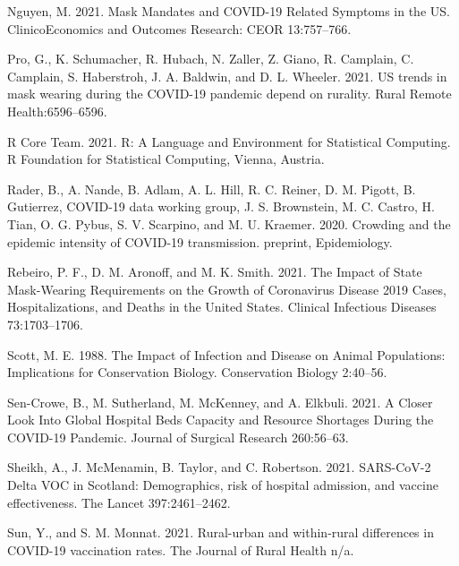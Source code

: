 \documentclass[
  12pt,
]{article}
\newlength{\cslhangindent}
\newlength{\cslentryspacingunit} %
\newenvironment{CSLReferences}[2] %
 {%
  \setlength{\parindent}{0pt}
  \ifodd #1
  \let\oldpar\par
  \def\par{\hangindent=\cslhangindent\oldpar}
  \fi
  \setlength{\parskip}{#2\cslentryspacingunit}
 }%
 {}
\begin{document}
\begin{CSLReferences}{1}{0}
\leavevmode{}%
Nguyen, M. 2021. Mask {Mandates} and {COVID}-19 {Related} {Symptoms} in the {US}. ClinicoEconomics and Outcomes Research: CEOR 13:757--766.

\leavevmode{}%
Pro, G., K. Schumacher, R. Hubach, N. Zaller, Z. Giano, R. Camplain, C. Camplain, S. Haberstroh, J. A. Baldwin, and D. L. Wheeler. 2021. {US} trends in mask wearing during the {COVID}-19 pandemic depend on rurality. Rural Remote Health:6596--6596.

\leavevmode{}%
R Core Team. 2021. R: {A} {Language} and {Environment} for {Statistical} {Computing}. R Foundation for Statistical Computing, Vienna, Austria.

\leavevmode{}%
Rader, B., A. Nande, B. Adlam, A. L. Hill, R. C. Reiner, D. M. Pigott, B. Gutierrez, COVID-19 data working group, J. S. Brownstein, M. C. Castro, H. Tian, O. G. Pybus, S. V. Scarpino, and M. U. Kraemer. 2020. Crowding and the epidemic intensity of {COVID}-19 transmission. preprint, Epidemiology.

\leavevmode{}%
Rebeiro, P. F., D. M. Aronoff, and M. K. Smith. 2021. The {Impact} of {State} {Mask}-{Wearing} {Requirements} on the {Growth} of {Coronavirus} {Disease} 2019 {Cases}, {Hospitalizations}, and {Deaths} in the {United} {States}. Clinical Infectious Diseases 73:1703--1706.

\leavevmode{}%
Scott, M. E. 1988. The {Impact} of {Infection} and {Disease} on {Animal} {Populations}: {Implications} for {Conservation} {Biology}. Conservation Biology 2:40--56.

\leavevmode{}%
Sen-Crowe, B., M. Sutherland, M. McKenney, and A. Elkbuli. 2021. A {Closer} {Look} {Into} {Global} {Hospital} {Beds} {Capacity} and {Resource} {Shortages} {During} the {COVID}-19 {Pandemic}. Journal of Surgical Research 260:56--63.

\leavevmode{}%
Sheikh, A., J. McMenamin, B. Taylor, and C. Robertson. 2021. {SARS}-{CoV}-2 {Delta} {VOC} in {Scotland}: Demographics, risk of hospital admission, and vaccine effectiveness. The Lancet 397:2461--2462.

\leavevmode{}%
Sun, Y., and S. M. Monnat. 2021. Rural-urban and within-rural differences in {COVID}-19 vaccination rates. The Journal of Rural Health n/a.


\end{CSLReferences}
\end{document}
